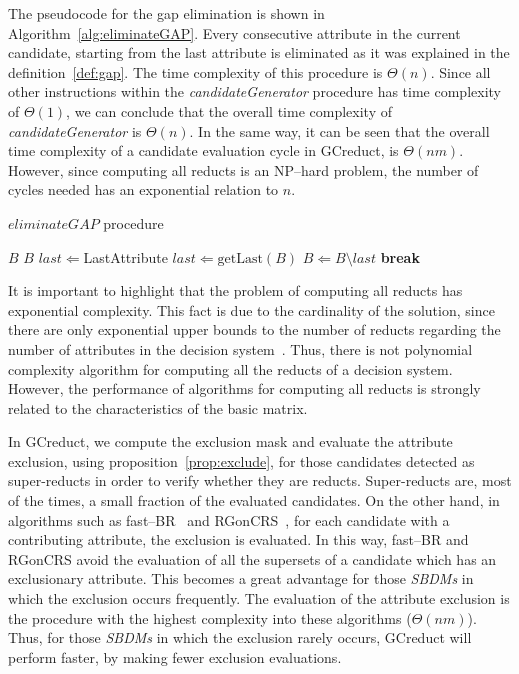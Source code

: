\documentclass[number,preprint,review,12pt]{elsarticle}
\begin{document}
	The pseudocode for the gap elimination is shown in Algorithm~\ref{alg:eliminateGAP}. Every consecutive attribute in the current candidate, starting from the last attribute is eliminated as it was explained in the definition~\ref{def:gap}. The time complexity of this procedure is $\Theta(n)$. Since all other instructions within the \textit{candidateGenerator} procedure has time complexity of $\Theta(1)$, we can conclude that the overall time complexity of \textit{candidateGenerator} is $\Theta(n)$. In the same way, it can be seen that the overall time complexity of a candidate evaluation cycle in GCreduct, is $\Theta(nm)$. However, since computing all reducts is an NP--hard problem, the number of cycles needed has an exponential relation to $n$.

	\begin{algorithm}
		\footnotesize
		\caption{$eliminateGAP$ procedure}
		\label{alg:eliminateGAP}
		\begin{algorithmic}[1]	
			\Require \textit{$B$}
			\Ensure $B$ 
			\State $last \Leftarrow $LastAttribute
			\State $last \Leftarrow \mathrm{getLast}(B)$
			\State $B \Leftarrow B\setminus last$
			\State \textbf{break}\label{line:gapEnd}
			\EndIf
			\EndWhile
		\end{algorithmic}
	\end{algorithm}
		
	It is important to highlight that the problem of computing all reducts has exponential complexity. This fact is due to the cardinality of the solution, since there are only exponential upper bounds to the number of reducts regarding the number of attributes in the decision system~\cite{Skowron92}. Thus, there is not  polynomial complexity algorithm for computing all the reducts of a decision system. However, the performance of algorithms for computing all reducts is strongly related to the characteristics of the basic matrix. 
	
	\label{par:complexity}
	In GCreduct, we compute the exclusion mask and evaluate the attribute exclusion, using proposition~\ref{prop:exclude}, for those candidates detected as super-reducts in order to verify whether they are reducts. Super-reducts are, most of the times, a small fraction of the evaluated candidates. On the other hand, in algorithms such as fast--BR~\cite{Lias13} and RGonCRS~\cite{WangP07}, for each candidate with a contributing attribute, the exclusion is evaluated. In this way, fast--BR and RGonCRS avoid the evaluation of all the supersets of a candidate which has an exclusionary attribute. This becomes a great advantage for those \textit{SBDMs} in which the exclusion occurs frequently. The evaluation of the attribute exclusion is the procedure with the highest complexity into these algorithms ($\Theta (nm)$). Thus, for those \textit{SBDMs} in which the exclusion rarely occurs, GCreduct will perform faster, by making fewer exclusion evaluations.
	
\end{document}
